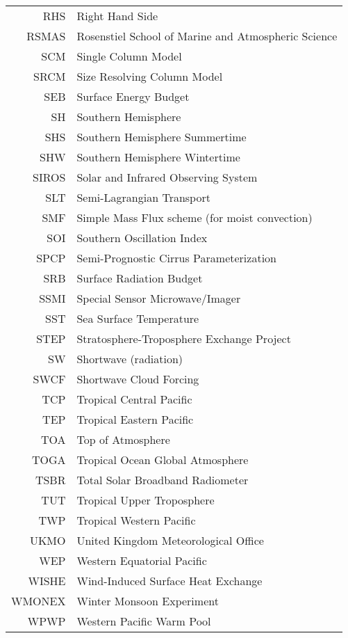 \begin{longtable}[l]{r l}
RHS & Right Hand Side \\
RSMAS & Rosenstiel School of Marine and Atmospheric Science \\
SCM & Single Column Model \\ 
SRCM & Size Resolving Column Model \\ 
SEB & Surface Energy Budget \\
SH & Southern Hemisphere \\
SHS & Southern Hemisphere Summertime \\
SHW & Southern Hemisphere Wintertime \\
SIROS & Solar and Infrared Observing System \\
SLT & Semi-Lagrangian Transport \\
SMF & Simple Mass Flux scheme (for moist convection) \\
SOI & Southern Oscillation Index \\
SPCP & Semi-Prognostic Cirrus Parameterization \\
SRB & Surface Radiation Budget \\
SSMI & Special Sensor Microwave/Imager \\
SST & Sea Surface Temperature \\
STEP & Stratosphere-Troposphere Exchange Project \\
SW & Shortwave (radiation) \\
SWCF & Shortwave Cloud Forcing \\
TCP & Tropical Central Pacific \\
TEP & Tropical Eastern Pacific \\
TOA & Top of Atmosphere \\
TOGA & Tropical Ocean Global Atmosphere \\
TSBR & Total Solar Broadband Radiometer \\
TUT & Tropical Upper Troposphere \\
TWP & Tropical Western Pacific \\
UKMO & United Kingdom Meteorological Office \\
WEP & Western Equatorial Pacific \\
WISHE & Wind-Induced Surface Heat Exchange \\ 
WMONEX & Winter Monsoon Experiment \\
WPWP & Western Pacific Warm Pool \\
\end{longtable}


